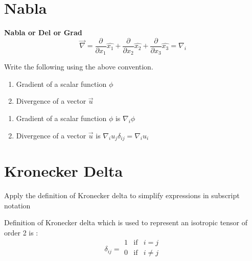 
\section{Nabla}

{\bf Nabla or Del or Grad}
\begin{equation*}
\vec{\nabla} =
\frac{\partial}{\partial x_1} \hat{x_1} +
\frac{\partial}{\partial x_2} \hat{x_2} +
\frac{\partial}{\partial x_3} \hat{x_3}
= \nabla_i
\end{equation*} 

\begin{question}
Write the following using the above convention.
	\begin{enumerate}
		\item Gradient of a scalar function $\phi$
		\item Divergence of a vector $\vec{u}$
	\end{enumerate}
\end{question}
\begin{solution}[print]
	\begin{enumerate}
		\item Gradient of a scalar function $\phi$ is $\nabla_i \phi$
		\item Divergence of a vector $\vec{u}$ is $\nabla_i u_j \delta_{ij} = \nabla_i u_i$
	\end{enumerate}
\end{solution}

\section{Kronecker Delta}

\begin{lo3}[Preliminaries]
Apply the definition of Kronecker delta to simplify expressions in subscript notation
\end{lo3}

Definition of Kronecker delta  which is used to represent an isotropic tensor of order 2 is : 
$$ \delta_{ij} = 
\begin{array}{lll}
1 & \mathrm{if} & i=j \\
0 & \mathrm{if} & i \ne j\\
\end{array} $$

